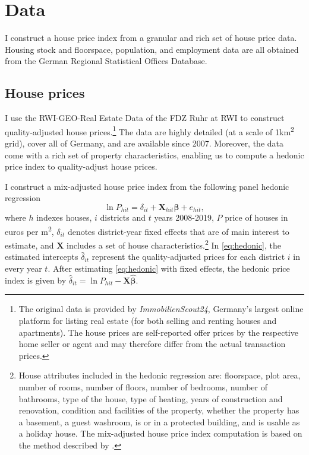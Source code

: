 \documentclass[
  12pt,
]{article}
\begin{document}
\section{Data}\label{data}

I construct a house price index from a granular and rich set of house price data. Housing stock and floorspace, population, and employment data are all obtained from the German Regional Statistical Offices Database.

\subsection{House prices}\label{hedonic}

I use the RWI-GEO-Real Estate Data of the FDZ Ruhr at RWI \citep{rwi2020} to construct quality-adjusted house prices.\footnote{The original data is provided by \emph{ImmobilienScout24}, Germany's largest online platform for listing real estate (for both selling and renting houses and apartments). The house prices are self-reported offer prices by the respective home seller or agent and may therefore differ from the actual transaction prices.} The data are highly detailed (at a scale of 1km\textsuperscript{2} grid), cover all of Germany, and are available since 2007. Moreover, the data come with a rich set of property characteristics, enabling us to compute a hedonic price index to quality-adjust house prices.

I construct a mix-adjusted house price index from the following panel hedonic regression \begin{equation}
  \ln P_{hit} = \delta_{it} + \mathbf{X}_{hit}\boldsymbol{\beta} + e_{hit},
  \label{eq:hedonic}
\end{equation} where \(h\) indexes houses, \(i\) districts and \(t\) years 2008-2019, \(P\) price of houses in euros per m\textsuperscript{2}, \(\delta_{it}\) denotes district-year fixed effects that are of main interest to estimate, and \(\mathbf{X}\) includes a set of house characteristics.\footnote{House attributes included in the hedonic regression are: floorspace, plot area, number of rooms, number of floors, number of bedrooms, number of bathrooms, type of the house, type of heating, years of construction and renovation, condition and facilities of the property, whether the property has a basement, a guest washroom, is or in a protected building, and is usable as a holiday house. The mix-adjusted house price index computation is based on the method described by \citet{abrs2020}.} In \eqref{eq:hedonic}, the estimated intercepts \(\widehat{\delta}_{it}\) represent the quality-adjusted prices for each district \(i\) in every year \(t\). After estimating \eqref{eq:hedonic} with fixed effects, the hedonic price index is given by \(\widehat{\delta}_{it} = \ln P_{hit} - \mathbf{X}\boldsymbol{\widehat{\beta}}\).
\end{document}
